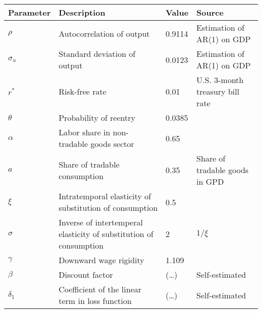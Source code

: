\begin{table}[h]
    \centering
    \begin{tabular}{@{}llll@{}}
        \toprule
    Parameter  & Description                                                       & Value  & Source                                                                         \\ \midrule
    $\rho$     & Autocorrelation of output                                         & 0.9114  & Estimation of AR(1) on GDP\\
    $\sigma_u$ & Standard deviation of output                                      & 0.0123 & Estimation of AR(1) on GDP \\
    $r^*$      & Risk-free rate                                                    & 0.01 & U.S. 3-month treasury bill rate \\
    $\theta$   & Probability of reentry                                            & 0.0385 & \citet*{Chatterjee-12}                                              \\
    $\alpha$   & Labor share in non-tradable goods sector                          & 0.65   & \citet{Jegajeevan-Sri-Lanka-DSGE}                                                       \\
    $a$        & Share of tradable consumption                                     & 0.35   & Share of tradable goods in GPD                  \\
    $\xi$      & Intratemporal elasticity of substitution of consumption & 0.5   & \citet{Na-18}                             \\
    $\sigma$   & Inverse of intertemperal elasticity of substitution of consumption  & 2   & $1 / \xi$                                                                      \\
    $\gamma$   & Downward wage rigidity                                            & 1.109   & \citet*{wage-rigidity-data}                  \\
    $\beta$    & Discount factor                                                   & (\dots)  &  Self-estimated                                                                              \\
    $\delta_1$ & Coefficient of the linear term in loss function                   &  (\dots) &   Self-estimated                                                                             \\

\end{tabular}
\end{table}

